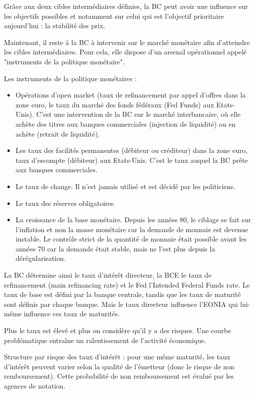 Grâce aux deux cibles intermédiaires définies, la BC peut avoir une influence sur les objectifs possibles et notamment sur celui qui est l'objectif prioritaire aujourd'hui : la stabilité des prix.

Maintenant, il reste à la BC à intervenir sur le marché monétaire afin d'atteindre les cibles intermédiaires. Pour cela, elle dispose d'un arsenal opérationnel appelé "instruments de la politique monétaire".



Les instruments de la politique monétaires :

\begin{itemize}
	\item Opérations d'open market (taux de refinancement par appel d'offres dans la zone euro, le taux du marché des fonds fédéraux (Fed Funds) aux Etats-Unis). C'est une intervention de la BC sur le marché interbancaire, où elle achète des titres aux banques commerciales (injection de liquidité) ou en achète (retrait de liquidité).
	\item Les taux des facilités permanentes (débiteur ou créditeur) dans la zone euro, taux d'escompte (débiteur) aux Etats-Unis. C'est le taux auquel la BC prête aux banques commerciales.
	\item Le taux de change. Il n'est jamais utilisé et est décidé par les politiciens.
	\item Le taux des réserves obligatoires
	\item La croissance de la base monétaire. Depuis les années 80, le ciblage se fait sur l'inflation et non la masse monétaire car la demande de monnaie est devenue instable. Le contrôle strict de la quantité de monnaie était possible avant les années 70 car la demande était stable, mais ne l'est plus depuis la dérégularisation.
\end{itemize}


La BC détermine ainsi le taux d'intérêt directeur, la BCE le taux de refinancement (main refinancing rate) et le Fed l'Intended Federal Funds rate. Le taux de base est défini par la banque centrale, tandis que les taux de maturité sont définis par chaque banque. Mais le taux directeur influence l'EONIA qui lui-même influence ces taux de maturités.

Plus le taux est élevé et plus on considère qu'il y a des risques. Une courbe problématique entraîne un ralentissement de l'activité économique.

Structure par risque des taux d'intérêt : pour une même maturité, les taux d'intérêt peuvent varier selon la qualité de l'émetteur (donc le risque de non remboursement). Cette probabilité de non remboursement est évalué par les agences de notation.
	
